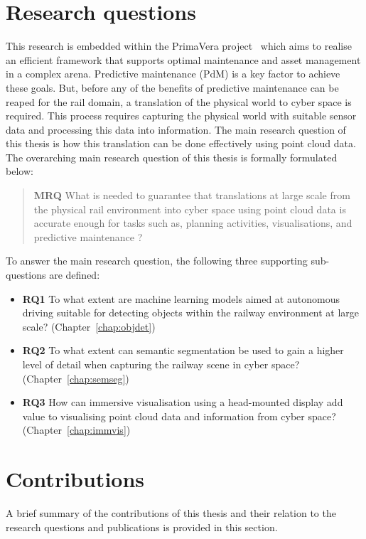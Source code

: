 \section{Research questions}
This research is embedded within the PrimaVera project~\parencite{ton.20} which aims to realise an efficient framework that supports optimal maintenance and asset management in a complex arena. Predictive maintenance (PdM) is a key factor to achieve these goals. But, before any of the benefits of predictive maintenance can be reaped for the rail domain, a translation of the physical world to cyber space is required. This process requires capturing the physical world with suitable sensor data and processing this data into information. The main research question of this thesis is how this translation can be done effectively using point cloud data. The overarching main research question of this thesis is formally formulated below:
\begin{quote}
    \textbf{MRQ} What is needed to guarantee that translations at large scale from the physical rail environment into cyber space using point cloud data is accurate enough for tasks such as, planning activities, visualisations, and predictive maintenance ?
\end{quote}

To answer the main research question, the following three supporting sub-questions are defined:
\begin{itemize}
	\item \textbf{RQ1} To what extent are machine learning models aimed at autonomous driving suitable for detecting objects within the railway environment at large scale? (Chapter~\ref{chap:objdet})
	\item \textbf{RQ2} To what extent can semantic segmentation be used to gain a higher level of detail when capturing the railway scene in cyber space? (Chapter~\ref{chap:semseg})
	\item \textbf{RQ3} How can immersive visualisation using a head-mounted display add value to visualising point cloud data and information from cyber space? (Chapter~\ref{chap:immvis})
\end{itemize}

\section{Contributions}
A brief summary of the contributions of this thesis and their relation to the research questions and publications is provided in this section.

